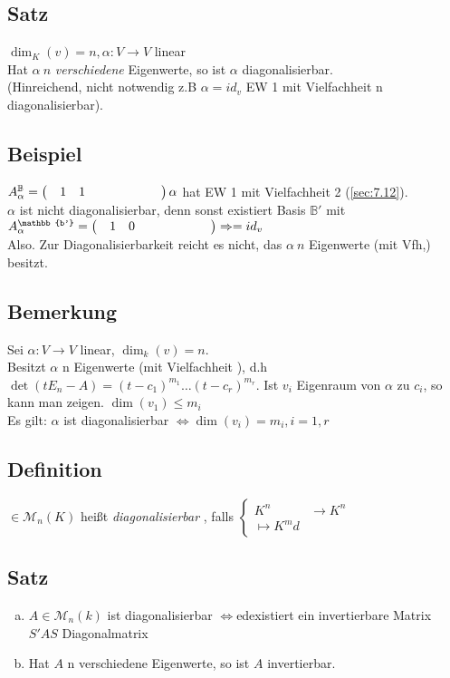 \subsection{Satz}\label{sec:\thesubsection}
$\dim_K(v) = n, \alpha : V \to V$ linear\\
Hat $\alpha\ n$ \emph{verschiedene} Eigenwerte, so ist $\alpha$ diagonalisierbar.\\
(Hinreichend, nicht notwendig z.B $\alpha = id_v$ EW 1 mit Vielfachheit n diagonalisierbar).
\subsection{Beispiel}\label{sec:\thesubsection}
$A^{\mathbb{B}}_\alpha = \Matrix{1,1;0,1}\\
\alpha$ hat EW 1 mit Vielfachheit 2 (\ref{sec:7.12}).\\
$\alpha$ ist nicht diagonalisierbar, denn sonst existiert Basis $\mathbb{B'}$ mit $A^{\mathbb{b'} }_\alpha = \Matrix{1,0;0,1} \Rightarrow = id_v$\Lightning\\
Also. Zur Diagonalisierbarkeit reicht es nicht, das $\alpha\ n$ Eigenwerte (mit Vfh,) besitzt.
\subsection{Bemerkung}
Sei $\alpha : V \to V$ linear, $\dim_k(v) = n$.\\
Besitzt $\alpha$ n Eigenwerte (mit Vielfachheit ), d.h $\det(t E_n -A) = (t-c_1)^{m_1} \ldots (t -c_r)^{m_r}$. Ist $v_i$ Eigenraum von $\alpha$ zu $c_i$, so kann man zeigen. $\dim(v_1) \leq m_i$\\
Es gilt: $\alpha$ ist diagonalisierbar $\Leftrightarrow \dim(v_i) = m_i, i=1,r$
\subsection{Definition}
$ \in \mathcal{M}_n(K)$ hei\ss t \emph{diagonalisierbar} , falls $\begin{cases}
K^n &\to K^n\\ \mapsto K^md
\end{cases}$
\subsection{Satz}
\begin{enumerate}[a)]
\item $A \in \mathcal{M}_n(k)$ ist diagonalisierbar $\Leftrightarrow$edexistiert ein invertierbare Matrix $S'A S$ Diagonalmatrix
\item Hat $A$ n verschiedene Eigenwerte, so ist $A$ invertierbar.
\end{enumerate}
\printindex

